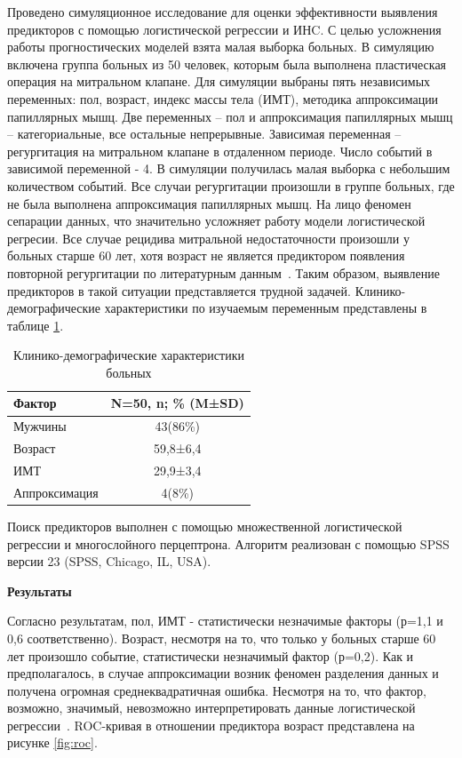 \documentclass[a4paper,twoside]{article}
\newcommand{\header}[1]{\bigskip\medskip\noindent\textbf{#1}\nopagebreak\bigskip}
\theoremstyle{theorem}
\theoremstyle{remark}
\begin{document}
Проведено симуляционное исследование для оценки эффективности выявления предикторов с помощью логистической регрессии и ИНC. С целью усложнения работы прогностических моделей взята малая выборка больных. В симуляцию включена группа больных из 50 человек, которым была выполнена пластическая операция на митральном клапане. Для симуляции выбраны пять независимых переменных: пол, возраст, индекс массы тела (ИМТ), методика аппроксимации папиллярных мышц. Две переменных – пол и аппроксимация папиллярных мышц – категориальные, все остальные непрерывные. Зависимая переменная – регургитация на митральном клапане в отдаленном периоде. Число событий в зависимой переменной - 4. В симуляции получилась малая выборка с небольшим количеством событий. Все случаи регургитации произошли в группе больных, где не была выполнена аппроксимация папиллярных мышц. На лицо феномен сепарации данных, что значительно усложняет работу модели логистической регресии. Все случае рецидива митральной недостаточности произошли у больных старше 60 лет, хотя возраст не является предиктором появления повторной регургитации по литературным данным~\cite{Conference}. Таким образом, выявление предикторов в такой ситуации представляется трудной задачей. Клинико-демографические характеристики по изучаемым переменным представлены в таблице \ref{tab:factor}.

\begin{table}[H]
	\caption{\label{tab:factor}Клинико-демографические характеристики больных}
\begin{center}
\begin{tabular}{lc}
	\hline
	\textbf{Фактор} & \textbf{N=50, n; \% (M±SD)} \\ \hline
	Мужчины & 43(86\%) \\
	Возраст & 59,8±6,4 \\
	ИМТ & 29,9±3,4 \\
	Аппроксимация & 4(8\%) \\
\end{tabular}
\end{center}
\end{table}

Поиск предикторов выполнен с помощью множественной логистической регрессии и многослойного перцептрона. Алгоритм реализован с помощью SPSS версии 23 (SPSS, Chicago, IL, USA).

\header{Результаты}

Согласно результатам, пол, ИМТ - статистически незначимые факторы (р=1,1 и 0,6 соответственно). Возраст, несмотря на то, что только у больных старше 60 лет произошло событие, статистически незначимый фактор (р=0,2). Как и предполагалось, в случае аппроксимации возник феномен разделения данных и получена огромная среднеквадратичная ошибка. Несмотря на то, что фактор, возможно, значимый, невозможно интерпретировать данные логистической регрессии~\cite{Sychev}. ROC-кривая в отношении предиктора возраст представлена на рисунке \ref{fig:roc}.
\end{document}
